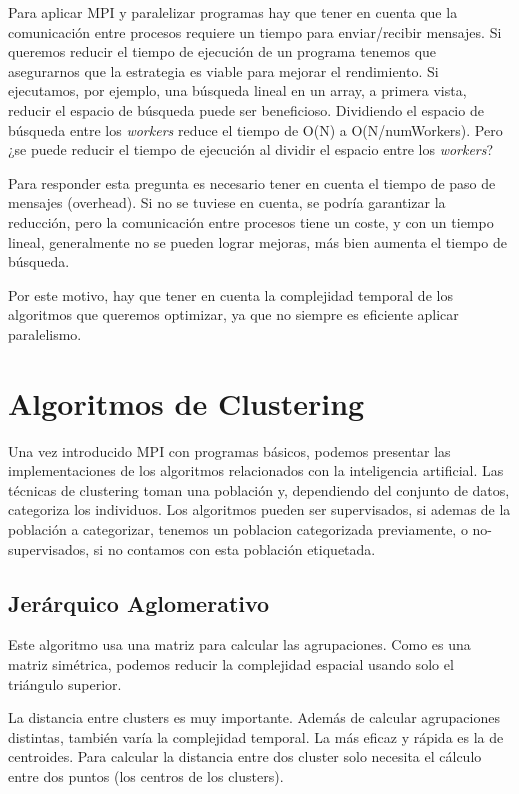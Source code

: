 	
	Para aplicar MPI y paralelizar programas hay que tener en cuenta que la comunicación entre procesos requiere un tiempo para enviar/recibir mensajes. Si queremos reducir el tiempo de ejecución de un programa tenemos que asegurarnos que la estrategia es viable para mejorar el rendimiento. Si ejecutamos, por ejemplo, una búsqueda lineal en un array, a primera vista, reducir el espacio de búsqueda puede ser beneficioso. Dividiendo el espacio de búsqueda entre los \textit{workers} reduce el tiempo de O(N) a O(N/numWorkers). Pero ¿se puede reducir el tiempo de ejecución al dividir el espacio entre los \textit{workers}? 
	
	Para responder esta pregunta es necesario tener en cuenta el tiempo de paso de mensajes (overhead). Si no se tuviese en cuenta, se podría garantizar la reducción, pero la comunicación entre procesos tiene un coste, y con un tiempo lineal, generalmente no se pueden lograr mejoras, más bien aumenta el tiempo de búsqueda.
	
	Por este motivo, hay que tener en cuenta la complejidad temporal de los algoritmos que queremos optimizar, ya que no siempre es eficiente aplicar paralelismo.

	\newpage 

\section{Algoritmos de Clustering}

	Una vez introducido MPI con programas básicos, podemos presentar las implementaciones de los algoritmos relacionados con la inteligencia artificial. Las técnicas de clustering toman una población y, dependiendo del conjunto de datos, categoriza los individuos. Los algoritmos pueden ser supervisados, si ademas de la población a categorizar, tenemos un poblacion categorizada previamente, o no-supervisados, si no contamos con esta población etiquetada.

	\subsection{Jerárquico Aglomerativo}
	\label{cap:3_2_1}
		Este algoritmo usa una matriz para calcular las agrupaciones. Como es una matriz simétrica, podemos reducir la complejidad espacial usando solo el triángulo superior. 
		
		La distancia entre clusters es muy importante. Además de calcular agrupaciones distintas, también varía la complejidad temporal. La más eficaz y rápida es la de centroides. Para calcular la distancia entre dos cluster solo necesita el cálculo entre dos puntos (los centros de los clusters). 
		
